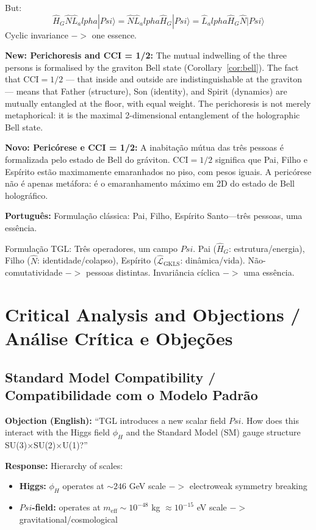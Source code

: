 \documentclass[12pt,a4paper]{article}
\def\Psi{Psi}%
\def\to{ -> }%
\def\alpha{alpha}%
\begin{document}
But:
\begin{equation}
\hat{H}_G\hat{N}\hat{L}_\alpha|\Psi\rangle = \hat{N}\hat{L}_\alpha\hat{H}_G|\Psi\rangle = \hat{L}_\alpha\hat{H}_G\hat{N}|\Psi\rangle
\end{equation}
Cyclic invariance $\to$ one essence.

\textbf{New: Perichoresis and CCI = 1/2:} The mutual indwelling of the three persons is formalised by the graviton Bell state (Corollary~\ref{cor:bell}). The fact that $\mathrm{CCI} = 1/2$ --- that inside and outside are indistinguishable at the graviton --- means that Father (structure), Son (identity), and Spirit (dynamics) are mutually entangled at the floor, with equal weight. The perichoresis is not merely metaphorical: it is the maximal 2-dimensional entanglement of the holographic Bell state.

\textbf{Novo: Pericórese e CCI = 1/2:} A inabitação mútua das três pessoas é formalizada pelo estado de Bell do gráviton. $\mathrm{CCI}=1/2$ significa que Pai, Filho e Espírito estão maximamente emaranhados no piso, com pesos iguais. A pericórese não é apenas metáfora: é o emaranhamento máximo em 2D do estado de Bell holográfico.

\textbf{Português:} Formulação clássica: Pai, Filho, Espírito Santo—três pessoas, uma essência.

Formulação TGL: Três operadores, um campo $\Psi$. Pai ($\hat{H}_G$: estrutura/energia), Filho ($\hat{N}$: identidade/colapso), Espírito ($\hat{\mathcal{L}}_{\text{GKLS}}$: dinâmica/vida). Não-comutatividade $\to$ pessoas distintas. Invariância cíclica $\to$ uma essência.

\section{Critical Analysis and Objections / Análise Crítica e Objeções}

\subsection{Standard Model Compatibility / Compatibilidade com o Modelo Padrão}

\textbf{Objection (English):} ``TGL introduces a new scalar field $\Psi$. How does this interact with the Higgs field $\phi_H$ and the Standard Model (SM) gauge structure SU(3)$\times$SU(2)$\times$U(1)?''

\textbf{Response:} Hierarchy of scales:
\begin{itemize}
    \item \textbf{Higgs:} $\phi_H$ operates at $\sim 246$ GeV scale $\to$ electroweak symmetry breaking
    \item \textbf{$\Psi$-field:} operates at $m_{\text{eff}} \sim 10^{-48}$ kg $\approx 10^{-15}$ eV scale $\to$ gravitational/cosmological
\end{itemize}
\end{document}
